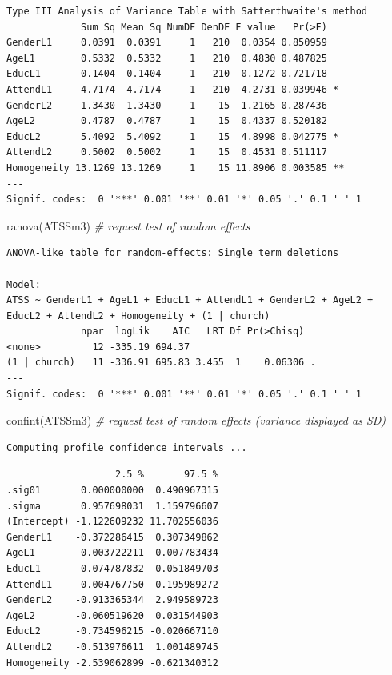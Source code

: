 \documentclass[
  11pt,
]{book}
\newenvironment{Shaded}{\begin{snugshade}}{\end{snugshade}}
\newcommand{\CommentTok}[1]{\textcolor[rgb]{0.56,0.35,0.01}{\textit{#1}}}
\newcommand{\FunctionTok}[1]{\textcolor[rgb]{0.00,0.00,0.00}{#1}}
\newcommand{\NormalTok}[1]{#1}
\begin{document}
\begin{verbatim}
Type III Analysis of Variance Table with Satterthwaite's method
             Sum Sq Mean Sq NumDF DenDF F value   Pr(>F)   
GenderL1     0.0391  0.0391     1   210  0.0354 0.850959   
AgeL1        0.5332  0.5332     1   210  0.4830 0.487825   
EducL1       0.1404  0.1404     1   210  0.1272 0.721718   
AttendL1     4.7174  4.7174     1   210  4.2731 0.039946 * 
GenderL2     1.3430  1.3430     1    15  1.2165 0.287436   
AgeL2        0.4787  0.4787     1    15  0.4337 0.520182   
EducL2       5.4092  5.4092     1    15  4.8998 0.042775 * 
AttendL2     0.5002  0.5002     1    15  0.4531 0.511117   
Homogeneity 13.1269 13.1269     1    15 11.8906 0.003585 **
---
Signif. codes:  0 '***' 0.001 '**' 0.01 '*' 0.05 '.' 0.1 ' ' 1
\end{verbatim}

\begin{Shaded}
\begin{Highlighting}[]
\FunctionTok{ranova}\NormalTok{(ATSSm3) }\CommentTok{\# request test of random effects}
\end{Highlighting}
\end{Shaded}

\begin{verbatim}
ANOVA-like table for random-effects: Single term deletions

Model:
ATSS ~ GenderL1 + AgeL1 + EducL1 + AttendL1 + GenderL2 + AgeL2 + EducL2 + AttendL2 + Homogeneity + (1 | church)
             npar  logLik    AIC   LRT Df Pr(>Chisq)  
<none>         12 -335.19 694.37                      
(1 | church)   11 -336.91 695.83 3.455  1    0.06306 .
---
Signif. codes:  0 '***' 0.001 '**' 0.01 '*' 0.05 '.' 0.1 ' ' 1
\end{verbatim}

\begin{Shaded}
\begin{Highlighting}[]
\FunctionTok{confint}\NormalTok{(ATSSm3) }\CommentTok{\# request test of random effects (variance displayed as SD)}
\end{Highlighting}
\end{Shaded}

\begin{verbatim}
Computing profile confidence intervals ...
\end{verbatim}

\begin{verbatim}
                   2.5 %       97.5 %
.sig01       0.000000000  0.490967315
.sigma       0.957698031  1.159796607
(Intercept) -1.122609232 11.702556036
GenderL1    -0.372286415  0.307349862
AgeL1       -0.003722211  0.007783434
EducL1      -0.074787832  0.051849703
AttendL1     0.004767750  0.195989272
GenderL2    -0.913365344  2.949589723
AgeL2       -0.060519620  0.031544903
EducL2      -0.734596215 -0.020667110
AttendL2    -0.513976611  1.001489745
Homogeneity -2.539062899 -0.621340312
\end{verbatim}
\end{document}
